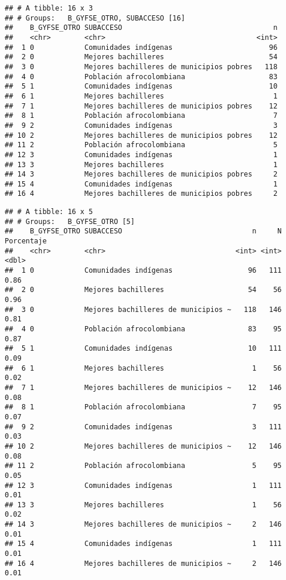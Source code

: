 \documentclass[]{article}
\theoremstyle{definition}
\theoremstyle{definition}
\theoremstyle{definition}
\theoremstyle{remark}
\begin{document}
\begin{verbatim}
## # A tibble: 16 x 3
## # Groups:   B_GYFSE_OTRO, SUBACCESO [16]
##    B_GYFSE_OTRO SUBACCESO                                    n
##    <chr>        <chr>                                    <int>
##  1 0            Comunidades indígenas                       96
##  2 0            Mejores bachilleres                         54
##  3 0            Mejores bachilleres de municipios pobres   118
##  4 0            Población afrocolombiana                    83
##  5 1            Comunidades indígenas                       10
##  6 1            Mejores bachilleres                          1
##  7 1            Mejores bachilleres de municipios pobres    12
##  8 1            Población afrocolombiana                     7
##  9 2            Comunidades indígenas                        3
## 10 2            Mejores bachilleres de municipios pobres    12
## 11 2            Población afrocolombiana                     5
## 12 3            Comunidades indígenas                        1
## 13 3            Mejores bachilleres                          1
## 14 3            Mejores bachilleres de municipios pobres     2
## 15 4            Comunidades indígenas                        1
## 16 4            Mejores bachilleres de municipios pobres     2
\end{verbatim}

\begin{verbatim}
## # A tibble: 16 x 5
## # Groups:   B_GYFSE_OTRO [5]
##    B_GYFSE_OTRO SUBACCESO                               n     N Porcentaje
##    <chr>        <chr>                               <int> <int>      <dbl>
##  1 0            Comunidades indígenas                  96   111       0.86
##  2 0            Mejores bachilleres                    54    56       0.96
##  3 0            Mejores bachilleres de municipios ~   118   146       0.81
##  4 0            Población afrocolombiana               83    95       0.87
##  5 1            Comunidades indígenas                  10   111       0.09
##  6 1            Mejores bachilleres                     1    56       0.02
##  7 1            Mejores bachilleres de municipios ~    12   146       0.08
##  8 1            Población afrocolombiana                7    95       0.07
##  9 2            Comunidades indígenas                   3   111       0.03
## 10 2            Mejores bachilleres de municipios ~    12   146       0.08
## 11 2            Población afrocolombiana                5    95       0.05
## 12 3            Comunidades indígenas                   1   111       0.01
## 13 3            Mejores bachilleres                     1    56       0.02
## 14 3            Mejores bachilleres de municipios ~     2   146       0.01
## 15 4            Comunidades indígenas                   1   111       0.01
## 16 4            Mejores bachilleres de municipios ~     2   146       0.01
\end{verbatim}
\end{document}
